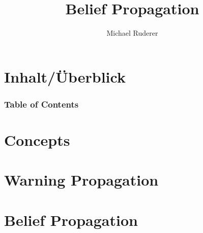 \documentclass{beamer}
\title{Belief Propagation}
\author{Michael Ruderer}
\institute{Uni Ulm\\}
\begin{document}
\hspace*{-1.49cm}
\frame[plain]{\titlepage}

\hspace*{-0.7cm}
\section*{Inhalt/Überblick} %
\begin{frame}
  \frametitle{Table of Contents}
  \tableofcontents
\end{frame}


\section{Concepts}



\section{Warning Propagation}


\section{Belief Propagation}

\end{document}
